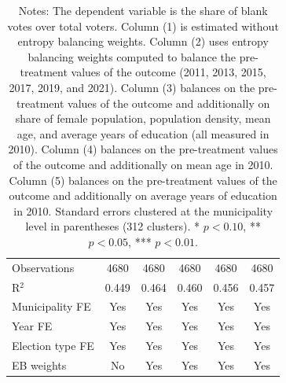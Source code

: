 \begin{table}[!h]
\begin{tabular}[t]{lccccc}
\addlinespace
Observations & 4680 & 4680 & 4680 & 4680 & 4680\\
R$^2$ & 0.449 & 0.464 & 0.460 & 0.456 & 0.457\\
Municipality FE & Yes & Yes & Yes & Yes & Yes\\
Year FE & Yes & Yes & Yes & Yes & Yes\\
Election type FE & Yes & Yes & Yes & Yes & Yes\\
EB weights & No & Yes & Yes & Yes & Yes\\
\hline
\end{tabular}
\vspace{0.3em}
\captionsetup{justification=justified, singlelinecheck=false}
\caption*{\footnotesize Notes: The dependent variable is the share of blank votes over total voters. Column (1) is estimated without entropy balancing weights. Column (2) uses entropy balancing weights computed to balance the pre-treatment values of the outcome (2011, 2013, 2015, 2017, 2019, and 2021). Column (3) balances on the pre-treatment values of the outcome and additionally on share of female population, population density, mean age, and average years of education (all measured in 2010). Column (4) balances on the pre-treatment values of the outcome and additionally on mean age in 2010. Column (5) balances on the pre-treatment values of the outcome and additionally on average years of education in 2010. Standard errors clustered at the municipality level in parentheses (312 clusters). * $p<0.10$, ** $p<0.05$, *** $p<0.01$.}
\end{table}
